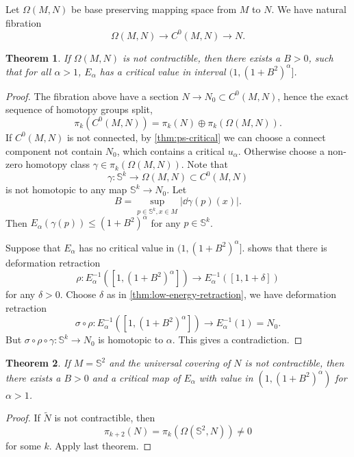 \documentclass[UTF8,12pt]{article}
\theoremstyle{plain}\newtheorem{theorem}{Theorem}
\theoremstyle{definition}\newtheorem{definition}[theorem]{Definition}
\theoremstyle{definition}\newtheorem{example}[theorem]{Example}
\theoremstyle{plain}\newtheorem{axiom}[theorem]{Axiom}
\theoremstyle{plain}\newtheorem{assertion}[theorem]{Assertion}
\theoremstyle{plain}\newtheorem{corollary}[theorem]{Corollary}
\theoremstyle{plain}\newtheorem{lemma}[theorem]{Lemma}
\theoremstyle{plain}\newtheorem{proposition}[theorem]{Proposition}
\theoremstyle{plain}\newtheorem{prop}[theorem]{Proposition}
\theoremstyle{plain}\newtheorem{conjecture}[theorem]{Conjecture}
\theoremstyle{plain}\newtheorem{conj}[theorem]{Conjecture}
\theoremstyle{plain}\newtheorem{problem}[theorem]{Problem}
\theoremstyle{remark}\newtheorem{notation}[theorem]{Notation}
\theoremstyle{definition}\newtheorem*{question}{Question}
\theoremstyle{definition}\newtheorem*{answer}{Answer}
\theoremstyle{definition}\newtheorem*{goal}{Goal}
\theoremstyle{plain}\newtheorem*{application}{Application}
\theoremstyle{plain}\newtheorem*{exercise}{Exercise}
\theoremstyle{remark}\newtheorem*{remark}{Remark}
\theoremstyle{remark}\newtheorem*{note}{\small{Note}}
\numberwithin{equation}{section}
\numberwithin{theorem}{section}
\numberwithin{figure}{section}
\begin{document}
Let \(\Omega(M,N)\) be base preserving mapping space from \(M\) to \(N\). We have
natural fibration \[
    \Omega(M,N)\longrightarrow C^0(M,N)\longrightarrow N
.\] 
\begin{theorem}
    If \(\Omega(M,N)\) is not contractible, then there exists a \(B>0\), such that
    for all \(\alpha>1\), \(E_\alpha\) has a critical value in interval 
    \((1,(1+B^2)^\alpha]\).
\end{theorem}
\begin{proof}
    The fibration above have a section \(N\to N_0\subset C^0(M,N)\), hence the exact
    sequence of homotopy groups split, \[
        \pi_k(C^0(M,N))=\pi_k(N)\oplus \pi_k(\Omega(M,N))
    .\] If \(C^0(M,N)\) is not connected, by \cref{thm:ps-critical} we can choose a
    connect component not contain \(N_0\), which contains a critical \(u_\alpha\).
    Otherwise choose a non-zero homotopy class \(\gamma\in \pi_k(\Omega(M,N))\).
    Note that \[
        \gamma \colon \mathbb{S}^k\to \Omega(M,N)\subset C^0(M,N)
    \] is not homotopic to any map \(\mathbb{S}^k\to N_0\). Let \[
        B=\sup_{p\in \mathbb{S}^k,x\in M}|\dd{\gamma(p)}(x)|
    .\] Then \(E_\alpha(\gamma(p))\le (1+B^2)^{\alpha}\) for any \(p\in\mathbb{S}^k\).

    Suppose that \(E_\alpha\) has no critical value in \((1,(1+B^2)^\alpha]\).
     shows that there is deformation retraction \[
        \rho\colon E_\alpha^{-1}([1,(1+B^2)^\alpha])
        \longrightarrow E_\alpha^{-1}([1,1+\delta])
    \] for any \(\delta>0\). Choose \(\delta\) as in \cref{thm:low-energy-retraction},
    we have deformation retraction \[
        \sigma\circ \rho\colon E_\alpha^{-1}([1,(1+B^2)^\alpha])
        \longrightarrow E_\alpha^{-1}(1)=N_0
    .\] But \(\sigma\circ \rho\circ \gamma\colon \mathbb{S}^k\to N_0\) is homotopic
    to \(\alpha\). This gives a contradiction.
\end{proof}

\begin{theorem}\label{thm:alpha-existence}
    If \(M=\mathbb{S}^2\) and the universal covering of \(N\) is not contractible,
    then there exists a \(B>0\) and a critical map of \(E_\alpha\) with value in
    \((1,(1+B^2)^\alpha)\) for \(\alpha>1\).
\end{theorem}
\begin{proof}
    If \(\tilde{N}\) is not contractible, then \[
        \pi_{k+2}(N)=\pi_k(\Omega(\mathbb{S}^2,N))\neq 0
    \] for some \(k\). Apply last theorem.
\end{proof}
\end{document}
